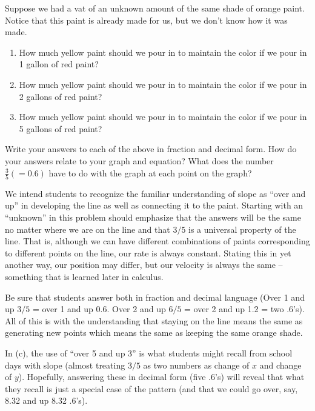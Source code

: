 \documentclass[nooutcomes, handout]{ximera}
\begin{document}
\begin{question} 
Suppose we had a vat of an unknown amount of the same shade of orange paint.  Notice that this paint is already made for us, but we don't know how it was made.
\begin{enumerate}
    \item How much yellow paint should we pour in to maintain the color if we pour in 1 gallon of red paint?
    \item How much yellow paint should we pour in to maintain the color if we pour in 2 gallons of red paint?
    \item How much yellow paint should we pour in to maintain the color if we pour in 5 gallons of red paint?
\end{enumerate}
Write your answers to each of the above in fraction and decimal form.  How do your answers relate to your graph and equation?  What does the number $\frac35  (= 0.6)$ have to do with the graph at each point on the graph?


\begin{instructorNotes}
We intend students to recognize the familiar understanding of slope as ``over and up'' in developing the line as well as connecting it to the paint.  Starting with an ``unknown'' in this problem should emphasize that the answers will be the same no matter where we are on the line and that $3/5$ is a universal property of the line.  That is, although we can have different combinations of paints corresponding to different points on the line, our rate is always constant. Stating this in yet another way, our position may differ, but our velocity is always the same -- something that is learned later in calculus.  

        Be sure that students answer both in fraction and decimal language (Over 1 and up $3/5$ = over 1 and up 0.6.  Over 2 and up $6/5$ = over 2 and up 1.2 = two .6's).  All of this is with the understanding that staying on the line means the same as generating new points which means the same as keeping the same orange shade.

         In (c), the use of ``over 5 and up 3'' is what students might recall from school days with slope (almost treating $3/5$ as two numbers as change of $x$ and change of $y$).  Hopefully, answering these in decimal form (five .6’s) will reveal that what they recall is just a special case of the pattern (and that we could go over, say, 8.32 and up 8.32 .6's).
\end{instructorNotes}
\end{question}
\end{document}
